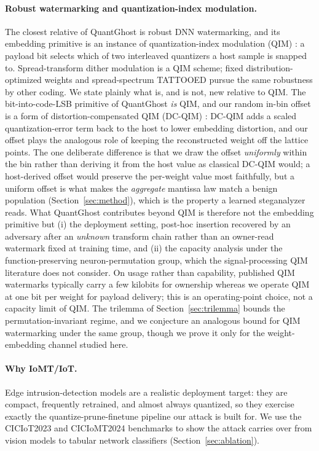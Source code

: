 \documentclass[a4paper,fleqn]{cas-dc}
\theoremstyle{plain}
\theoremstyle{remark}
\newcommand{\sys}{\mbox{QuantGhost}}
\begin{document}
\paragraph{Robust watermarking and quantization-index modulation.} The closest relative
of \sys{} is robust DNN watermarking, and its embedding primitive is an instance of
quantization-index modulation (QIM) \cite{chen2001qim}: a payload bit selects which of two
interleaved quantizers a host sample is snapped to. Spread-transform dither modulation
\cite{li2021stdm} is a QIM scheme; fixed distribution-optimized weights
\cite{tondi2022robust} and spread-spectrum TATTOOED \cite{pagnotta2022tattooed} pursue the
same robustness by other coding. We state plainly what is, and is not, new relative to QIM.
The bit-into-code-LSB primitive of \sys{} \emph{is} QIM, and our random in-bin offset is a
form of distortion-compensated QIM (DC-QIM) \cite{chen2001qim}: DC-QIM adds a scaled
quantization-error term back to the host to lower embedding distortion, and our offset plays
the analogous role of keeping the reconstructed weight off the lattice points. The one
deliberate difference is that we draw the offset \emph{uniformly} within the bin rather than
deriving it from the host value as classical DC-QIM would; a host-derived offset would
preserve the per-weight value most faithfully, but a uniform offset is what makes the
\emph{aggregate} mantissa law match a benign population (Section~\ref{sec:method}), which is
the property a learned steganalyzer reads. What \sys{} contributes beyond QIM is therefore
not the embedding primitive but (i) the deployment setting, post-hoc insertion recovered by
an adversary after an \emph{unknown} transform chain rather than an owner-read watermark fixed
at training time, and (ii) the capacity analysis under the function-preserving neuron-permutation
group, which the signal-processing QIM literature does not consider. On usage rather than
capability, published QIM watermarks typically carry a few kilobits for ownership whereas we
operate QIM at one bit per weight for payload delivery; this is an operating-point choice, not
a capacity limit of QIM. The trilemma of Section~\ref{sec:trilemma} bounds the
permutation-invariant regime, and we conjecture an analogous bound for QIM watermarking under
the same group, though we prove it only for the weight-embedding channel studied here.

\paragraph{Why IoMT/IoT.} Edge intrusion-detection models are a realistic deployment
target: they are compact, frequently retrained, and almost always quantized, so they
exercise exactly the quantize-prune-finetune pipeline our attack is built for. We use the
CICIoT2023 \cite{neto2023ciciot2023} and CICIoMT2024 \cite{dadkhah2024ciciomt2024}
benchmarks to show the attack carries over from vision models to tabular network
classifiers (Section~\ref{sec:ablation}).
\end{document}
